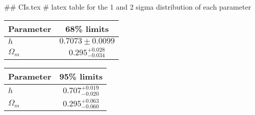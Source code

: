 ## CIs.tex
# latex table for the 1 and 2 sigma distribution of each parameter

\begin{tabular} { l  c}
 Parameter &  68\% limits\\
\hline
{\boldmath$h              $} & $0.7073\pm 0.0099          $\\
{\boldmath$\Omega_m       $} & $0.295^{+0.028}_{-0.034}   $\\
\hline
\end{tabular}

\begin{tabular} { l  c}
 Parameter &  95\% limits\\
\hline
{\boldmath$h              $} & $0.707^{+0.019}_{-0.020}   $\\
{\boldmath$\Omega_m       $} & $0.295^{+0.063}_{-0.060}   $\\
\hline
\end{tabular}
